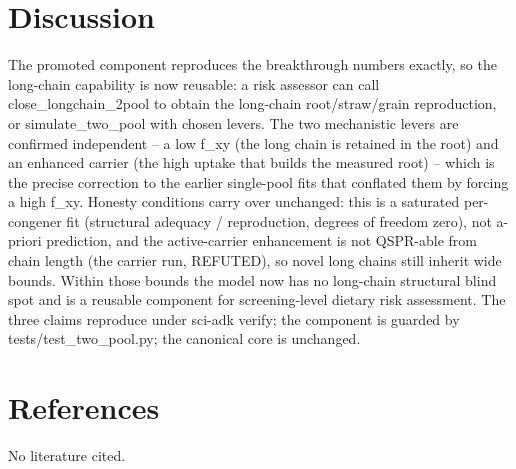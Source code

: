\documentclass{article}
\begin{document}
\section{Discussion}
The promoted component reproduces the breakthrough numbers exactly, so the long-chain capability is now reusable: a risk assessor can call close\_longchain\_2pool to obtain the long-chain root/straw/grain reproduction, or simulate\_two\_pool with chosen levers. The two mechanistic levers are confirmed independent -- a low f\_xy (the long chain is retained in the root) and an enhanced carrier (the high uptake that builds the measured root) -- which is the precise correction to the earlier single-pool fits that conflated them by forcing a high f\_xy. Honesty conditions carry over unchanged: this is a saturated per-congener fit (structural adequacy / reproduction, degrees of freedom zero), not a-priori prediction, and the active-carrier enhancement is not QSPR-able from chain length (the carrier run, REFUTED), so novel long chains still inherit wide bounds. Within those bounds the model now has no long-chain structural blind spot and is a reusable component for screening-level dietary risk assessment. The three claims reproduce under sci-adk verify; the component is guarded by tests/test\_two\_pool.py; the canonical core is unchanged.

\section{References}
No literature cited.
\end{document}
